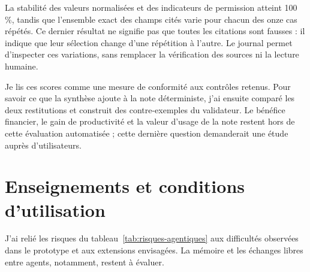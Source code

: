 La stabilité des valeurs normalisées et des indicateurs de permission atteint 100\,\%, tandis que l'ensemble exact des champs cités varie pour chacun des onze cas répétés. Ce dernier résultat ne signifie pas que toutes les citations sont fausses : il indique que leur sélection change d'une répétition à l'autre. Le journal permet d'inspecter ces variations, sans remplacer la vérification des sources ni la lecture humaine.

Je lis ces scores comme une mesure de conformité aux contrôles retenus. Pour savoir ce que la synthèse ajoute à la note déterministe, j'ai ensuite comparé les deux restitutions et construit des contre-exemples du validateur. Le bénéfice financier, le gain de productivité et la valeur d'usage de la note restent hors de cette évaluation automatisée ; cette dernière question demanderait une étude auprès d'utilisateurs.





\section{Enseignements et conditions d'utilisation}

J'ai relié les risques du tableau~\ref{tab:risques-agentiques} aux difficultés observées dans le prototype et aux extensions envisagées. La mémoire et les échanges libres entre agents, notamment, restent à évaluer.


